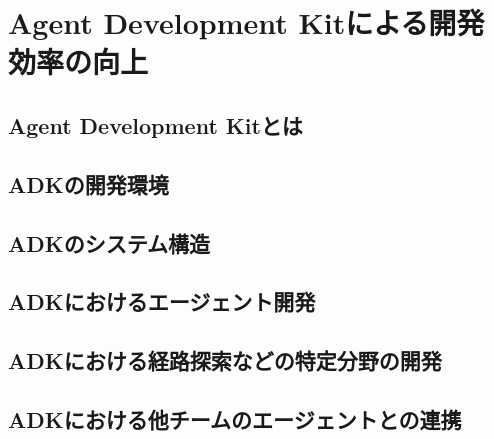 \newcommand{\VI}{Agent Development Kit}
\newcommand{\adk}{Agent Development Kit}


\chapter{\adk による開発効率の向上}

\thispagestyle{myheadings}
\section{\adk とは}
\section{ADKの開発環境}
\section{ADKのシステム構造}
\section{ADKにおけるエージェント開発}
\section{ADKにおける経路探索などの特定分野の開発}
\section{ADKにおける他チームのエージェントとの連携}


